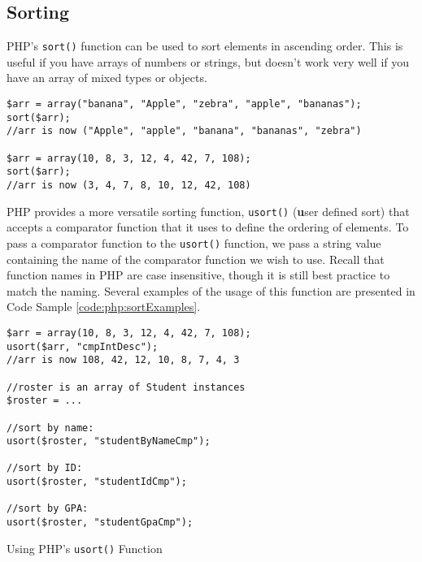 \subsection{Sorting}

PHP's \texttt{sort()} function can be used to sort elements
in ascending order.  This is useful if you have arrays of numbers or
strings, but doesn't work very well if you have an array of mixed types
or objects.  

\begin{verbatim}
$arr = array("banana", "Apple", "zebra", "apple", "bananas");
sort($arr);
//arr is now ("Apple", "apple", "banana", "bananas", "zebra")

$arr = array(10, 8, 3, 12, 4, 42, 7, 108);
sort($arr);
//arr is now (3, 4, 7, 8, 10, 12, 42, 108)
\end{verbatim}

PHP provides a more versatile sorting function, \texttt{usort()}
(\textbf{u}ser defined sort) that accepts a comparator function that
it uses to define the ordering of elements.  To pass a comparator function
to the \texttt{usort()} function, we pass a string value containing
the name of the comparator function we wish to use.  Recall that function
names in PHP are case insensitive, though it is still best practice to
match the naming. Several examples of the usage 
of this function are presented in Code Sample \ref{code:php:sortExamples}.

\begin{listing}[H]
\begin{verbatim}
$arr = array(10, 8, 3, 12, 4, 42, 7, 108);
usort($arr, "cmpIntDesc");
//arr is now 108, 42, 12, 10, 8, 7, 4, 3

//roster is an array of Student instances
$roster = ...

//sort by name:
usort($roster, "studentByNameCmp");

//sort by ID:
usort($roster, "studentIdCmp");

//sort by GPA:
usort($roster, "studentGpaCmp");
\end{verbatim}
\caption{Using PHP's \texttt{usort()} Function}
\label{code:php:sortExamples}
\end{listing}


